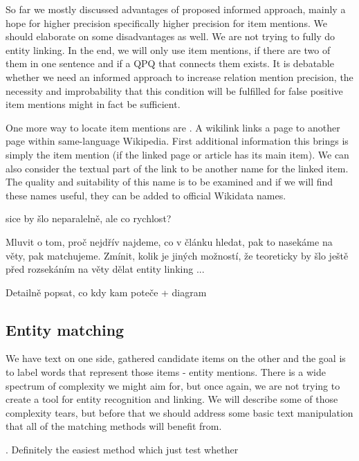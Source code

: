 So far we mostly discussed advantages of proposed informed approach, mainly a hope for higher precision specifically higher precision for item mentions. We should elaborate on some disadvantages as well. We are not trying to fully do entity linking. In the end, we will only use item mentions, if there are two of them in one sentence and if a QPQ that connects them exists. It is debatable whether we need an informed approach to increase relation mention precision, the necessity and improbability that this condition will be fulfilled for false positive item mentions might in fact be sufficient. 

One more way to locate item mentions are . A wikilink links a page to another page within same-language Wikipedia. First additional information this brings is simply the item mention (if the linked page or article has its main item). We can also consider the textual part of the link to be another name for the linked item. The quality and suitability of this name is to be examined and if we will find these names useful, they can be added to official Wikidata names.



sice by šlo neparalelně, ale co rychlost?

Mluvit o tom, proč nejdřív najdeme, co v článku hledat, pak to nasekáme na věty, pak matchujeme. Zmínit, kolik je jiných možností, že teoreticky by šlo ještě před rozsekáním na věty dělat entity linking ...

Detailně popsat, co kdy kam poteče + diagram


\subsection{Entity matching}

We have text on one side, gathered candidate items on the other and the goal is to label words that represent those items - entity mentions. There is a wide spectrum of complexity we might aim for, but once again, we are not trying to create a tool for entity recognition and linking. We will describe some of those complexity tears, but before that we should address some basic text manipulation that all of the matching methods will benefit from.



. Definitely the easiest method which just test whether 

